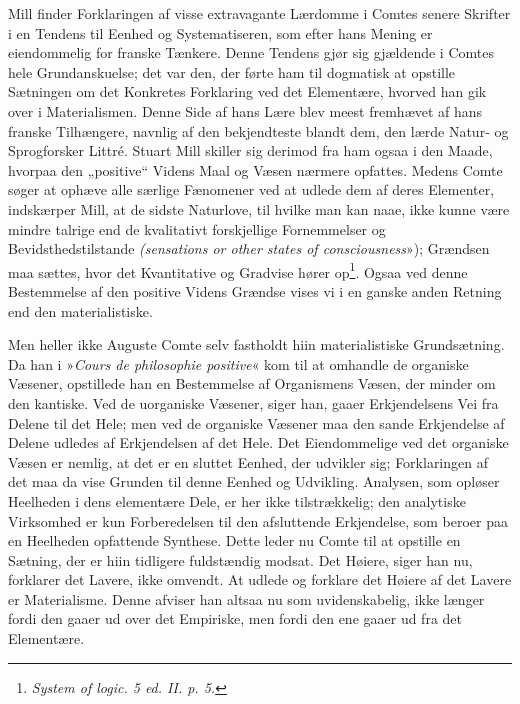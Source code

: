 \documentclass[12pt,a4paper,openany]{book}
\newcommand{\opage}[1]{\marginnote{\footnotesize\textit{[#1]}}}
\begin{document}
Mill finder Forklaringen af visse extravagante Lærdomme
i Comtes senere Skrifter i en Tendens til Eenhed og
Systematiseren, som efter hans Mening er eiendommelig for
franske Tænkere. Denne Tendens gjør sig gjældende i
Comtes hele Grundanskuelse; det var den, der førte ham til
dogmatisk at opstille Sætningen om det Konkretes Forklaring
\opage{206}ved det Elementære, hvorved han gik over i Materialismen.
Denne Side af hans Lære blev meest fremhævet af hans
franske Tilhængere, navnlig af den bekjendteste blandt dem,
den lærde Natur- og Sprogforsker Littré. Stuart Mill
skiller sig derimod fra ham ogsaa i den Maade, hvorpaa
den „positive“ Videns Maal og Væsen nærmere opfattes.
Medens Comte søger at ophæve alle særlige Fænomener ved
at udlede dem af deres Elementer, indskærper Mill, at de
sidste Naturlove, til hvilke man kan naae, ikke kunne være
mindre talrige end de kvalitativt forskjellige Fornemmelser og
Bevidsthedstilstande \textit{(sensations or other states of consciousness}»);
Grændsen maa sættes, hvor det Kvantitative og
Gradvise hører op\footnote{\textit{System of logic. 5 ed. II. p. 5.}}. Ogsaa ved denne Bestemmelse af den
positive Videns Grændse vises vi i en ganske anden Retning
end den materialistiske.

Men heller ikke Auguste Comte selv fastholdt hiin materialistiske
Grundsætning. Da han i »\textit{Cours de philosophie
positive}« kom til at omhandle de organiske Væsener, opstillede
han en Bestemmelse af Organismens Væsen, der
minder om den kantiske. Ved de uorganiske Væsener, siger
han, gaaer Erkjendelsens Vei fra Delene til det Hele;
men ved de organiske Væsener maa den sande Erkjendelse
af Delene udledes af Erkjendelsen af det Hele.
Det Eiendommelige ved det organiske Væsen er nemlig, at
det er en sluttet Eenhed, der udvikler sig; Forklaringen af
det maa da vise Grunden til denne Eenhed og Udvikling.
Analysen, som opløser Heelheden i dens elementære Dele, er
her ikke tilstrækkelig; den analytiske Virksomhed er kun Forberedelsen
til den afsluttende Erkjendelse, som beroer paa en
Heelheden opfattende Synthese. Dette leder nu Comte til
at opstille en Sætning, der er hiin tidligere fuldstændig
modsat. Det Høiere, siger han nu, forklarer det Lavere, ikke
omvendt. At udlede og forklare det Høiere af det Lavere er
\opage{207}Materialisme. Denne afviser han altsaa nu som uvidenskabelig,
ikke længer fordi den gaaer ud over det Empiriske,
men fordi den ene gaaer ud fra det Elementære.
\end{document}
